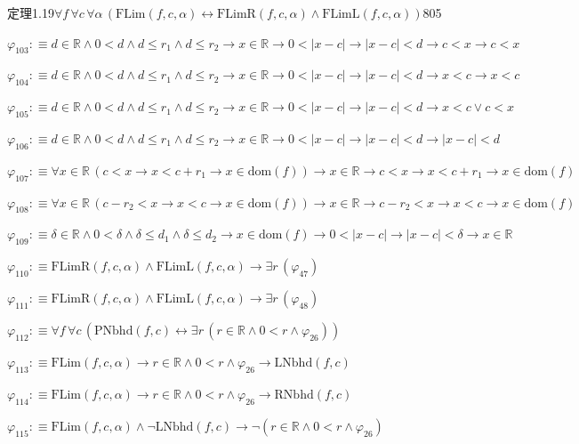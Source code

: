 \begin{fullproof}{定理1.19}{$\forall f\,\forall c\,\forall \alpha\,(\mathrm{FLim}(f,c,\alpha) \leftrightarrow \mathrm{FLimR}(f,c,\alpha) \land \mathrm{FLimL}(f,c,\alpha))$}{805}
\begin{abbrevlist}
\item $\varphi_{103} :\equiv d \in \mathbb{R} \land 0 < d \land d \leq r_{1} \land d \leq r_{2} \to x \in \mathbb{R} \to 0 < \lvert x - c \rvert \to \lvert x - c \rvert < d \to c < x \to c < x$
\item $\varphi_{104} :\equiv d \in \mathbb{R} \land 0 < d \land d \leq r_{1} \land d \leq r_{2} \to x \in \mathbb{R} \to 0 < \lvert x - c \rvert \to \lvert x - c \rvert < d \to x < c \to x < c$
\item $\varphi_{105} :\equiv d \in \mathbb{R} \land 0 < d \land d \leq r_{1} \land d \leq r_{2} \to x \in \mathbb{R} \to 0 < \lvert x - c \rvert \to \lvert x - c \rvert < d \to x < c \lor c < x$
\item $\varphi_{106} :\equiv d \in \mathbb{R} \land 0 < d \land d \leq r_{1} \land d \leq r_{2} \to x \in \mathbb{R} \to 0 < \lvert x - c \rvert \to \lvert x - c \rvert < d \to \lvert x - c \rvert < d$
\item $\varphi_{107} :\equiv \forall x \in \mathbb{R}\,(c < x \to x < c + r_{1} \to x \in \mathrm{dom}(f)) \to x \in \mathbb{R} \to c < x \to x < c + r_{1} \to x \in \mathrm{dom}(f)$
\item $\varphi_{108} :\equiv \forall x \in \mathbb{R}\,(c - r_{2} < x \to x < c \to x \in \mathrm{dom}(f)) \to x \in \mathbb{R} \to c - r_{2} < x \to x < c \to x \in \mathrm{dom}(f)$
\item $\varphi_{109} :\equiv \delta \in \mathbb{R} \land 0 < \delta \land \delta \leq d_{1} \land \delta \leq d_{2} \to x \in \mathrm{dom}(f) \to 0 < \lvert x - c \rvert \to \lvert x - c \rvert < \delta \to x \in \mathbb{R}$
\item $\varphi_{110} :\equiv \mathrm{FLimR}(f,c,\alpha) \land \mathrm{FLimL}(f,c,\alpha) \to \exists r\,(\varphi_{47})$
\item $\varphi_{111} :\equiv \mathrm{FLimR}(f,c,\alpha) \land \mathrm{FLimL}(f,c,\alpha) \to \exists r\,(\varphi_{48})$
\item $\varphi_{112} :\equiv \forall f\,\forall c\,(\mathrm{PNbhd}(f,c) \leftrightarrow \exists r\,(r \in \mathbb{R} \land 0 < r \land \varphi_{26}))$
\item $\varphi_{113} :\equiv \mathrm{FLim}(f,c,\alpha) \to r \in \mathbb{R} \land 0 < r \land \varphi_{26} \to \mathrm{LNbhd}(f,c)$
\item $\varphi_{114} :\equiv \mathrm{FLim}(f,c,\alpha) \to r \in \mathbb{R} \land 0 < r \land \varphi_{26} \to \mathrm{RNbhd}(f,c)$
\item $\varphi_{115} :\equiv \mathrm{FLim}(f,c,\alpha) \land \neg \mathrm{LNbhd}(f,c) \to \neg (r \in \mathbb{R} \land 0 < r \land \varphi_{26})$

\end{abbrevlist}
\end{fullproof}
